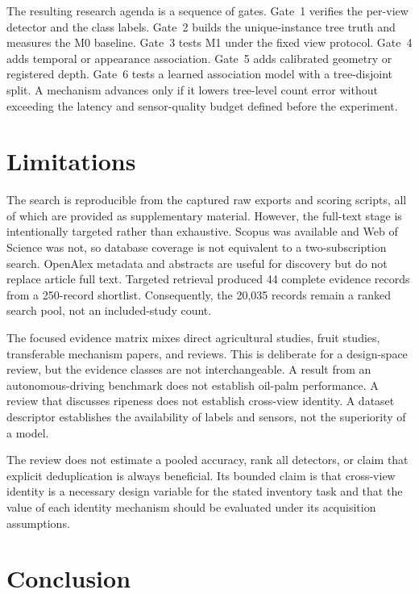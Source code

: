 The resulting research agenda is a sequence of gates. Gate~1 verifies the per-view detector and the class labels. Gate~2 builds the unique-instance tree truth and measures the M0 baseline. Gate~3 tests M1 under the fixed view protocol. Gate~4 adds temporal or appearance association. Gate~5 adds calibrated geometry or registered depth. Gate~6 tests a learned association model with a tree-disjoint split. A mechanism advances only if it lowers tree-level count error without exceeding the latency and sensor-quality budget defined before the experiment.


\section{Limitations}
\label{sec:limitations}

The search is reproducible from the captured raw exports and scoring scripts, all of which are provided as supplementary material. However, the full-text stage is intentionally targeted rather than exhaustive. Scopus was available and Web of Science was not, so database coverage is not equivalent to a two-subscription search. OpenAlex metadata and abstracts are useful for discovery but do not replace article full text. Targeted retrieval produced 44 complete evidence records from a 250-record shortlist. Consequently, the 20,035 records remain a ranked search pool, not an included-study count.

The focused evidence matrix mixes direct agricultural studies, fruit studies, transferable mechanism papers, and reviews. This is deliberate for a design-space review, but the evidence classes are not interchangeable. A result from an autonomous-driving benchmark does not establish oil-palm performance. A review that discusses ripeness does not establish cross-view identity. A dataset descriptor establishes the availability of labels and sensors, not the superiority of a model.

The review does not estimate a pooled accuracy, rank all detectors, or claim that explicit deduplication is always beneficial. Its bounded claim is that cross-view identity is a necessary design variable for the stated inventory task and that the value of each identity mechanism should be evaluated under its acquisition assumptions.


\section{Conclusion}
\label{sec:conclusion}

